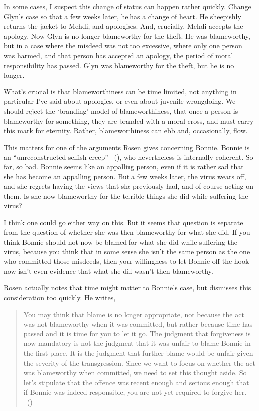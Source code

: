 \documentclass[
  10pt,
  letterpaper,
  twoside]{scrbook}
\begin{document}
In some cases, I suspect this change of status can happen rather
quickly. Change {Glyn}'s case so that a few weeks later, he has a change
of heart. He sheepishly returns the jacket to {Mehdi}, and apologises.
And, crucially, {Mehdi} accepts the apology. Now {Glyn} is no longer
blameworthy for the theft. He was blameworthy, but in a case where the
misdeed was not too excessive, where only one person was harmed, and
that person has accepted an apology, the period of moral responsibility
has passed. {Glyn} was blameworthy for the theft, but he is no longer.

What's crucial is that blameworthiness can be time limited, not anything
in particular I've said about apologies, or even about juvenile
wrongdoing. We should reject the `branding' model of blameworthiness,
that once a person is blameworthy for something, they are branded with a
moral cross, and must carry this mark for eternity. Rather,
blameworthiness can ebb and, occasionally, flow.

This matters for one of the arguments Rosen gives concerning {Bonnie}.
{Bonnie} is an ``unreconstructed selfish creep''
~(), who nevertheless is
internally coherent. So far, so bad. {Bonnie} seems like an appalling
person, even if it is rather sad that she has become an appalling
person. But a few weeks later, the virus wears off, and she regrets
having the views that she previously had, and of course acting on them.
Is she now blameworthy for the terrible things she did while suffering
the virus?

I think one could go either way on this. But it seems that question is
separate from the question of whether she was then blameworthy for what
she did. If you think {Bonnie} should not now be blamed for what she did
while suffering the virus, because you think that in some sense she
isn't the same person as the one who committed those misdeeds, then your
willingness to let {Bonnie} off the hook now isn't even evidence that
what she did wasn't then blameworthy.

Rosen actually notes that time might matter to {Bonnie}'s case, but
dismisses this consideration too quickly. He writes,

\begin{quote}
You may think that blame is no longer appropriate, not because the act
was not blameworthy when it was committed, but rather because time has
passed and it is time for you to let it go. The judgment that
forgiveness is now mandatory is not the judgment that it was unfair to
blame {Bonnie} in the first place. It is the judgment that further blame
would be unfair given the severity of the transgression. Since we want
to focus on whether the act was blameworthy when committed, we need to
set this thought aside. So let's stipulate that the offence was recent
enough and serious enough that if {Bonnie} was indeed responsible, you
are not yet required to forgive her. ~()
\end{quote}
\end{document}
